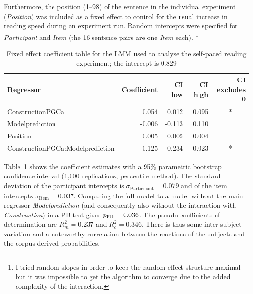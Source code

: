 Furthermore, the position (1--98) of the sentence in the individual experiment (\textit{Position}) was included as a fixed effect to control for the usual increase in reading speed during an experiment run.
Random intercepts were specified for \textit{Participant} and \textit{Item} (the 16 sentence pairs are one \textit{Item} each).%
\footnote{I tried random slopes in order to keep the random effect structure maximal \citep{BarrEa2013} but it was impossible to get the algorithm to converge due to the added complexity of the interaction.}

\begin{table}
  \centering
  \begin{tabular}{lrrrc}
    Regressor & \multicolumn{1}{r}{Coefficient} & \multicolumn{1}{r}{CI low} & \multicolumn{1}{r}{CI high} & \multicolumn{1}{r}{CI excludes 0} \\ \midrule
    ConstructionPGCa                 &  0.054 &  0.012 &  0.095 &  *  \\ 
    Modelprediction                  & -0.006 & -0.113 &  0.110 &     \\ 
    Position                         & -0.005 & -0.005 &  0.004 &     \\ 
    ConstructionPGCa:Modelprediction & -0.125 & -0.234 & -0.023 &  *  \\ 
  \end{tabular}
  \caption{Fixed effect coefficient table for the LMM used to analyse the self-paced reading experiment; the intercept is 0.829}
  \label{tab:exp:spr}
\end{table}

Table~\ref{tab:exp:spr} shows the coefficient estimates with a 95\% parametric bootstrap confidence interval (1,000 replications, percentile method).
The standard deviation of the participant intercepts is $\sigma_{\text{Participant}}=0.079$ and of the item intercepts $\sigma_{\text{Item}}=0.037$.
Comparing the full model to a model without the main regressor \textit{Modelprediction} (and consequently also without the interaction with \textit{Construction}) in a PB test gives $p_{\text{PB}}=0.036$.
The pseudo-coefficients of determination are $R^2_m=0.237$ and $R^2_c=0.346$.
There is thus some inter-subject variation and a noteworthy correlation between the reactions of the subjects and the corpus-derived probabilities.

